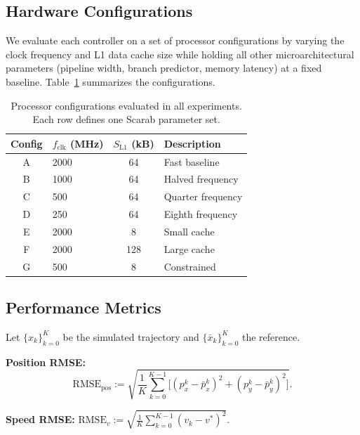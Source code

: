 \documentclass[conference]{IEEEtran}
\newcommand{\RMSE}{\mathrm{RMSE}}
\begin{document}
\subsection{Hardware Configurations}\label{sec:hw_configs}

We evaluate each controller on a set of processor configurations
by varying the clock frequency and L1 data cache size while
holding all other microarchitectural parameters (pipeline width,
branch predictor, memory latency) at a fixed baseline.
Table~\ref{tab:hw} summarizes the configurations.

\begin{table}[t]
  \centering
  \caption{Processor configurations evaluated in all experiments.
    Each row defines one Scarab parameter set.}
  \label{tab:hw}
  \footnotesize
  \begin{tabular}{clcl}
    \toprule
    \textbf{Config} & $f_{\text{clk}}$ (MHz)
      & $S_{\text{L1}}$ (kB) & \textbf{Description} \\
    \midrule
    A & 2000 &  64  & Fast baseline  \\
    B & 1000 &  64  & Halved frequency  \\
    C & 500  &  64  & Quarter frequency  \\
    D & 250  &  64  & Eighth frequency  \\
    E & 2000 &   8  & Small cache  \\
    F & 2000 & 128  & Large cache  \\
    G & 500  &   8  & Constrained  \\
    \bottomrule
  \end{tabular}
\end{table}

\subsection{Performance Metrics}

Let $\{x_k\}_{k=0}^K$ be the simulated trajectory and
$\{\bar{x}_k\}_{k=0}^K$ the reference.

\noindent\textbf{Position RMSE:}
\begin{equation}\label{eq:rmse}
  \RMSE_{\mathrm{pos}} :=
  \sqrt{\frac{1}{K}\sum_{k=0}^{K-1}
    \bigl[(p_x^k - \bar{p}_x^k)^2 + (p_y^k - \bar{p}_y^k)^2\bigr]}.
\end{equation}

\noindent\textbf{Speed RMSE:}
$\RMSE_v := \sqrt{\frac{1}{K}\sum_{k=0}^{K-1}(v_k - v^*)^2}$.
\end{document}
